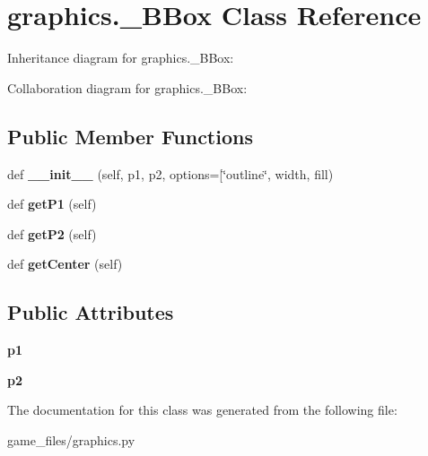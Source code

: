 \hypertarget{classgraphics_1_1__BBox}{}\section{graphics.\+\_\+\+B\+Box Class Reference}
\label{classgraphics_1_1__BBox}


Inheritance diagram for graphics.\+\_\+\+B\+Box\+:


Collaboration diagram for graphics.\+\_\+\+B\+Box\+:
\subsection*{Public Member Functions}
\begin{DoxyCompactItemize}
\item 
def {\bfseries \+\_\+\+\_\+init\+\_\+\+\_\+} (self, p1, p2, options=\mbox{[}\char`\"{}outline\char`\"{}, width, fill)\hypertarget{classgraphics_1_1__BBox_a5738b02041db947dbbcb555ad6e6095a}{}\label{classgraphics_1_1__BBox_a5738b02041db947dbbcb555ad6e6095a}

\item 
def {\bfseries get\+P1} (self)\hypertarget{classgraphics_1_1__BBox_a2c3e73e8149fd0036055b94d28c3fbb4}{}\label{classgraphics_1_1__BBox_a2c3e73e8149fd0036055b94d28c3fbb4}

\item 
def {\bfseries get\+P2} (self)\hypertarget{classgraphics_1_1__BBox_aee9d6dc9fcb9eb74ee8281662d87f361}{}\label{classgraphics_1_1__BBox_aee9d6dc9fcb9eb74ee8281662d87f361}

\item 
def {\bfseries get\+Center} (self)\hypertarget{classgraphics_1_1__BBox_a7ffb5899c2626c1d882dae28b9eaf211}{}\label{classgraphics_1_1__BBox_a7ffb5899c2626c1d882dae28b9eaf211}

\end{DoxyCompactItemize}
\subsection*{Public Attributes}
\begin{DoxyCompactItemize}
\item 
{\bfseries p1}\hypertarget{classgraphics_1_1__BBox_a7d6ecb1b61e338a8f28e333c1e242b55}{}\label{classgraphics_1_1__BBox_a7d6ecb1b61e338a8f28e333c1e242b55}

\item 
{\bfseries p2}\hypertarget{classgraphics_1_1__BBox_ae54a3cc11dc9be1624b0fbef0bf22d70}{}\label{classgraphics_1_1__BBox_ae54a3cc11dc9be1624b0fbef0bf22d70}

\end{DoxyCompactItemize}


The documentation for this class was generated from the following file\+:\begin{DoxyCompactItemize}
\item 
game\+\_\+files/graphics.\+py\end{DoxyCompactItemize}
